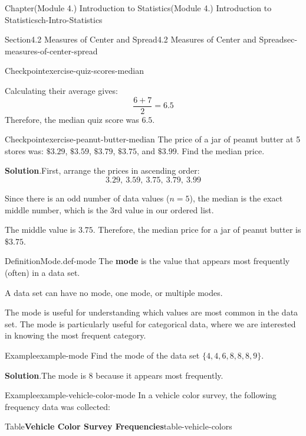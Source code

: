 \documentclass[oneside,10pt,]{book}
\newcommand{\blocktitlefont}{\relax}
\newcommand{\terminology}[1]{\textbf{#1}}
\begin{document}
\begin{chapterptx}{Chapter}{(Module 4.) Introduction to Statistics}{}{(Module 4.) Introduction to Statistics}{}{}{ch-Intro-Statistics}
\begin{sectionptx}{Section}{4.2 Measures of Center and Spread}{}{4.2 Measures of Center and Spread}{}{}{sec-measures-of-center-spread}
\begin{inlineexercise}{Checkpoint}{}{exercise-quiz-scores-median}
\par
Calculating their average gives:%
\begin{equation*}
\frac{6 + 7}{2} = 6.5
\end{equation*}
Therefore, the median quiz score was \(6.5\).%
\end{inlineexercise}%
\begin{inlineexercise}{Checkpoint}{}{exercise-peanut-butter-median}%
The price of a jar of peanut butter at 5 stores was: \(\$3.29\), \(\$3.59\), \(\$3.79\), \(\$3.75\), and \(\$3.99\). Find the median price.%
\par\smallskip%
\noindent\textbf{\blocktitlefont Solution}.\hypertarget{exercise-peanut-butter-median-2}{}\quad{}First, arrange the prices in ascending order:%
\begin{equation*}
3.29, \ 3.59, \ 3.75, \ 3.79, \ 3.99
\end{equation*}
%
\par
Since there is an odd number of data values (\(n = 5\)), the median is the exact middle number, which is the 3rd value in our ordered list.%
\par
The middle value is \(3.75\). Therefore, the median price for a jar of peanut butter is \(\$3.75\).%
\end{inlineexercise}%
\begin{definition}{Definition}{Mode.}{def-mode}%
The \terminology{mode}  is the value that appears most frequently (often) in a data set.%
\par
A data set can have no mode, one mode, or multiple modes.%
\par
The mode is useful for understanding which values are most common in the data set. The mode is particularly useful for categorical data, where we are interested in knowing the most frequent category.%
\end{definition}
\begin{example}{Example}{}{example-mode}%
Find the mode of the data set \(\{4, 4, 6, 8, 8, 8, 9\}\).%
\par\smallskip%
\noindent\textbf{\blocktitlefont Solution}.\hypertarget{example-mode-2}{}\quad{}The mode is \(8\) because it appears most frequently.%
\end{example}
\begin{example}{Example}{}{example-vehicle-color-mode}%
In a vehicle color survey, the following frequency data was collected:%
\begin{tableptx}{Table}{\textbf{Vehicle Color Survey Frequencies}}{table-vehicle-colors}{}%
\centering%

\end{tableptx}
\end{example}
\end{sectionptx}
\end{chapterptx}
\end{document}
